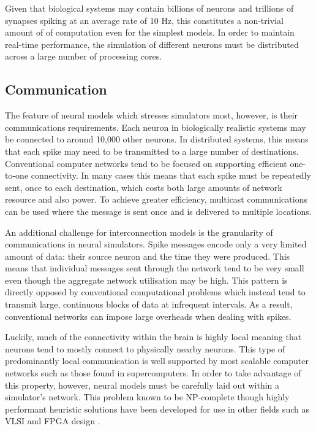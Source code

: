 			Given that biological systems may contain billions of neurons and
			trillions of synapses spiking at an average rate of 10 Hz, this
			constitutes a non-trivial amount of of computation even for the simplest
			models. In order to maintain real-time performance, the simulation of
			different neurons must be distributed across a large number of processing
			cores.
		
		\subsection{Communication}
			
			
			The feature of neural models which stresses simulators most, however, is
			their communications requirements. Each neuron in biologically realistic
			systems may be connected to around 10,000 other neurons. In distributed
			systems, this means that each spike may need to be transmitted to a large
			number of destinations. Conventional computer networks tend to be focused
			on supporting efficient one-to-one connectivity. In many cases this means
			that each spike must be repeatedly sent, once to each destination, which
			costs both large amounts of network resource and also power. To achieve
			greater efficiency, multicast communications can be used where the message
			is sent once and is delivered to multiple locations.
			
			An additional challenge for interconnection models is the granularity of
			communications in neural simulators. Spike messages encode only a very
			limited amount of data: their source neuron and the time they were
			produced. This means that individual messages sent through the network
			tend to be very small even though the aggregate network utilisation may be
			high. This pattern is directly opposed by conventional computational
			problems which instead tend to transmit large, continuous blocks of data
			at infrequent intervals. As a result, conventional networks can impose
			large overheads when dealing with spikes.
			
			Luckily, much of the connectivity within the brain is highly local meaning
			that neurons tend to mostly connect to physically nearby neurons. This
			type of predominantly local communication is well supported by most
			scalable computer networks such as those found in supercomputers. In order
			to take advantage of this property, however, neural models must be
			carefully laid out within a simulator's network. This problem known to be
			NP-complete though highly performant heuristic solutions have been
			developed for use in other fields such as VLSI and FPGA design
			\cite{haldar00}.
	
